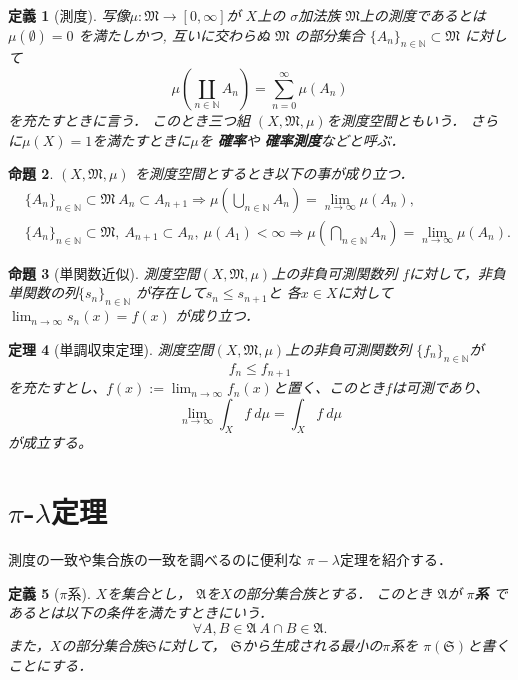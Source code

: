 \documentclass[leqno, a4paper, 12pt]{jsarticle}
\newtheorem{thm}{定理}
\newtheorem{prop}[thm]{命題}
\newtheorem{df}[thm]{定義}
\newcommand{\To}{\Longrightarrow}
\newcommand{\nn}{\mathbb{N}}
\newcommand{\mgn}{\infty}
\begin{document}
\begin{df}[測度]
写像$  \mu :\mathfrak{M} \rightarrow [0,\infty]$が
$X$上の
$\sigma $加法族
$\mathfrak{M}$上の測度であるとは
$\mu(\emptyset)=0$
を満たしかつ,
互いに交わらぬ
$\mathfrak{M}$
の部分集合
$\{A_{n}\}_{n\in \nn}\subset \mathfrak{M}$
に対して
 \[
  \mu \left(\coprod_{n\in \nn }{A_{n}}\right)=\sum_{n=0}^{\infty}\mu (A_{n})
 \]
を充たすときに言う．
このとき三つ組
$(X,\mathfrak{M}, \mu)$を測度空間ともいう．
さらに$\mu(X)=1$を満たすときに$\mu$を
\textbf{確率}や
\textbf{確率測度}などと呼ぶ．
\end{df}


\begin{prop}\label{lim}
$(X,\mathfrak{M},\mu)$
を測度空間とするとき以下の事が成り立つ．
	\begin{align}
	&\{A_n\}_{n\in \nn}\subset \mathfrak{M}\ A_n\subset A_{n+1}\To
	\mu \left(\bigcup_{n\in \mathbb{N}} A_{n}\right)=
	\lim_{n \to \infty}\mu (A_{n}),\\ 
	&\{A_n\}_{n\in \nn}\subset \mathfrak{M},\ A_{n+1}\subset A_{n},\ \mu(A_1)<\mgn\To
	 \mu \left(\bigcap_{n\in \mathbb{N}} A_{n}\right)=\lim_{n \to \infty}\mu (A_{n}).
	\end{align}
\end{prop}


\begin{prop}[単関数近似]\label{prop:tankinji}
測度空間$(X, \mathfrak{M}, \mu)$上の非負可測関数列
$f$に対して，非負単関数の列$\{s_{n}\}_{n\in \nn}$
が存在して$s_{n}\le s_{n+1}$と
各$x\in X$に対して$\lim_{n\to \infty}s_{n}(x)=f(x)$
が成り立つ．
\end{prop}

\begin{thm}[単調収束定理]\label{thm:tancho}
測度空間$(X, \mathfrak{M}, \mu)$上の非負可測関数列
$\{f_{n}\}_{n\in \nn}$が
 \[
  f_{n}\le f_{n+1}
 \]を充たすとし、$\displaystyle f(x):=\lim_{n\to \infty}f_{n}(x)$と置く、このとき$f$は可測であり、
 \[
  \lim_{n\to \infty}\int_X f\ d \mu =\int_X f\ d\mu
 \] が成立する。
\end{thm}



\section{$\pi$-$\lambda$定理}
測度の一致や集合族の一致を調べるのに便利な
$\pi-\lambda$定理を紹介する．
\begin{df}[$\pi$系]
$X$を集合とし，
$\mathfrak{A}$を$X$の部分集合族とする．
このとき
$\mathfrak{A}$が
\textbf{$\pi$系}
であるとは以下の条件を満たすときにいう．
\[
\forall A, B\in \mathfrak{A}\ A\cap B\in \mathfrak{A}. 
\]
また，$X$の部分集合族$\mathfrak{S}$に対して，
$\mathfrak{S}$から生成される最小の$\pi$系を
$\pi(\mathfrak{S})$と書くことにする．
\end{df}
\end{document}
